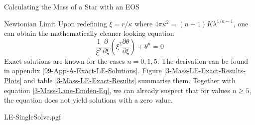 \begin{section}{Calculating the Mass of a Star with an EOS}
\begin{subsection}{Newtonian Limit}
Upon redefining $\xi=r/\kappa$ where $4\pi\kappa^2=(n+1)K\lambda^{1/n-1}$, one can obtain the mathematically cleaner looking equation
\begin{equation}
	\frac{1}{\xi^2}\frac{\partial}{\partial\xi}\left(\xi^2\frac{\partial\theta}{\partial\xi}\right) + \theta^n=0 \label{3-Mass-Lane-Emden-Eq}
\end{equation}
Exact solutions are known for the cases $n=0,1,5$. The derivation can be found in appendix \ref{99-App-A-Exact-LE-Solutions}. Figure \ref{3-Mass-LE-Exact-Results-Plots} and table \ref{3-Mass-LE-Exact-Results} summarise them. Together with equation \eqref{3-Mass-Lane-Emden-Eq}, we can already suspect that for values $n\geq5$, the equation does not yield solutions with a zero value.\\
\noindent
\begin{minipage}{0.5\textwidth}
	\centering
	{LE-SingleSolve.pgf}
\end{minipage}\hfill%
\begin{minipage}{0.45\textwidth}
	\renewcommand{\arraystretch}{1.2}
	\begin{tabular}[b]{@{}lcccc@{}}

\end{tabular}
\end{minipage}
\end{subsection}
\end{section}
